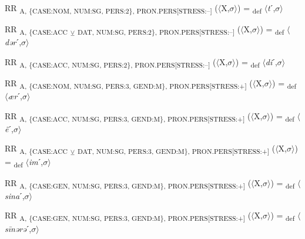 {\begin{exe}
 RR \textsubscript{A, \{CASE:NOM, NUM:SG, PERS:2\}, PRON.PERS[STRESS:–]} ($\langle$X,$\sigma $$\rangle$) = \textsubscript{def} $\langle$\textit{t}ˊ,$\sigma $$\rangle$
\end{exe}

\begin{exe}
 RR \textsubscript{A, \{CASE:ACC} \textsubscript{${\veebar}$}\textsubscript{ DAT, NUM:SG, PERS:2\}, PRON.PERS[STRESS:–]} ($\langle$X,$\sigma $$\rangle$) = \textsubscript{def} $\langle$\textit{dər}ˊ,$\sigma $$\rangle$
\end{exe}

\begin{exe}
 RR \textsubscript{A, \{CASE:ACC, NUM:SG, PERS:2\}, PRON.PERS[STRESS:–]} ($\langle$X,$\sigma $$\rangle$) = \textsubscript{def} $\langle$\textit{di}ˊ,$\sigma $$\rangle$
\end{exe}

\begin{exe}
 RR \textsubscript{A, \{CASE:NOM, NUM:SG, PERS:3, GEND:M\}, PRON.PERS[STRESS:+]} ($\langle$X,$\sigma $$\rangle$) = \textsubscript{def} $\langle$\textit{ær}ˊ,$\sigma $$\rangle$
\end{exe}

\begin{exe}
 RR \textsubscript{A, \{CASE:ACC, NUM:SG, PERS:3, GEND:M\}, PRON.PERS[STRESS:+]} ($\langle$X,$\sigma $$\rangle$) = \textsubscript{def} $\langle$\textit{ẽ}ˊ,$\sigma $$\rangle$
\end{exe}

\begin{exe}
 RR \textsubscript{A, \{CASE:ACC} \textsubscript{${\veebar}$}\textsubscript{ DAT, NUM:SG, PERS:3, GEND:M\}, PRON.PERS[STRESS:+]} ($\langle$X,$\sigma $$\rangle$) = \textsubscript{def} $\langle$\textit{im}ˊ,$\sigma $$\rangle$
\end{exe}

\begin{exe}
 RR \textsubscript{A, \{CASE:GEN, NUM:SG, PERS:3, GEND:M\}, PRON.PERS[STRESS:+]} ($\langle$X,$\sigma $$\rangle$) = \textsubscript{def} $\langle$\textit{sina}ˊ,$\sigma $$\rangle$
\end{exe}

\begin{exe}
 RR \textsubscript{A, \{CASE:GEN, NUM:SG, PERS:3, GEND:M\}, PRON.PERS[STRESS:+]} ($\langle$X,$\sigma $$\rangle$) = \textsubscript{def} $\langle$\textit{s\=inərə}ˊ,$\sigma $$\rangle$
\end{exe}

}

